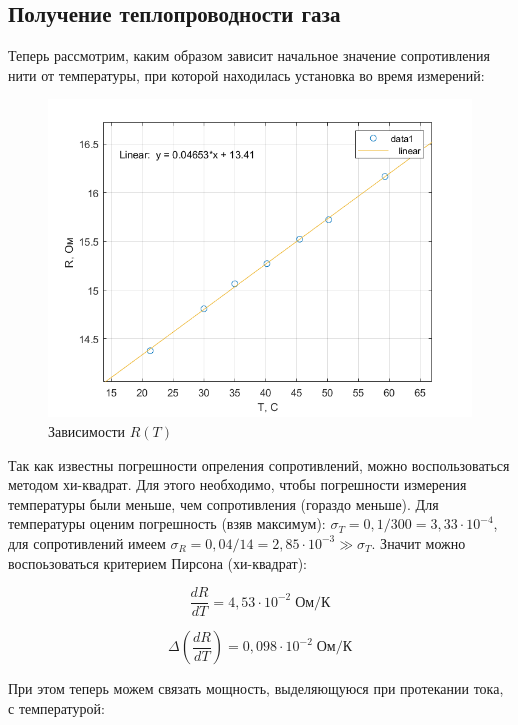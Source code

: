 \documentclass[a4paper, 12pt]{article} %
\begin{document}
\subsection{Получение теплопроводности газа}

Теперь рассмотрим, каким образом зависит начальное значение сопротивления нити от температуры, при которой находилась установка во время измерений:

\begin{figure}[!h]
    \centering
    \includegraphics[width = 13 cm]{RT.png}
    \caption{Зависимости $R(T)$}
    \label{fig:vac}
\end{figure}

Так как известны погрешности опреления сопротивлений, можно воспользоваться методом хи-квадрат. Для этого необходимо, чтобы погрешности измерения температуры были меньше, чем сопротивления (гораздо меньше). Для температуры оценим погрешность (взяв максимум): $\sigma_T = 0,1 / 300 = 3,33 \cdot 10^{-4}$, для сопротивлений имеем $\sigma_R = 0,04 / 14 = 2,85 \cdot 10^{-3} \gg \sigma_T$. Значит можно воспоьзоваться критерием Пирсона (хи-квадрат):

\begin{equation}
    \frac{dR}{dT} = 4,53 \cdot 10^{-2} \; \text{Ом/К}
\end{equation}

\begin{equation}
    \Delta \left( \frac{dR}{dT} \right) = 0,098 \cdot 10^{-2} \; \text{Ом/К}
\end{equation}

При этом теперь можем связать мощность, выделяющуюся при протекании тока, с температурой:
\end{document}

